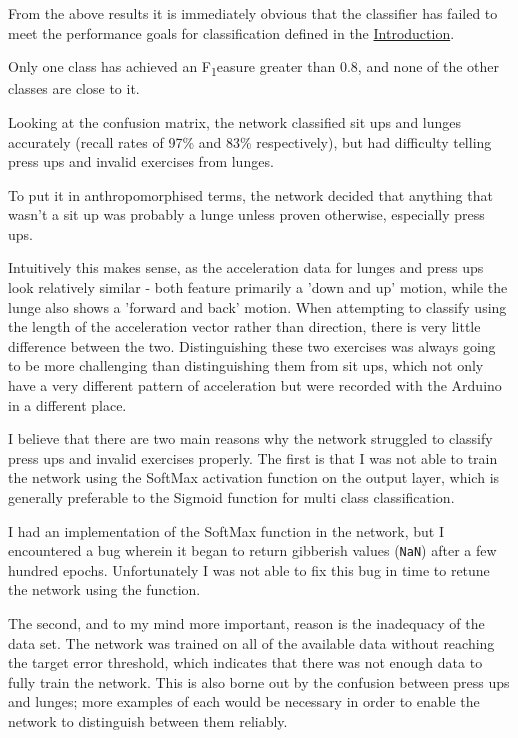\documentclass[a4paper]{article}
\begin{document}
From the above results it is immediately obvious that the classifier has failed to meet the performance goals for classification defined in the \hyperref[subsubsec:in_cs_ecmetrics]{Introduction}.

Only one class has achieved an F\texorpdfstring{\textsubscript{1}} measure greater than 0.8, and none of the other classes are close to it.

Looking at the confusion matrix, the network classified sit ups and lunges accurately (recall rates of 97\% and 83\% respectively), but had difficulty telling press ups and invalid exercises from lunges. 

To put it in anthropomorphised terms, the network decided that anything that wasn't a sit up was probably a lunge unless proven otherwise, especially press ups.

Intuitively this makes sense, as the acceleration data for lunges and press ups look relatively similar - both feature primarily a 'down and up' motion, while the lunge also shows a 'forward and back' motion. When attempting to classify using the length of the acceleration vector rather than direction, there is very little difference between the two.
Distinguishing these two exercises was always going to be more challenging than distinguishing them from sit ups, which not only have a very different pattern of acceleration but were recorded with the Arduino in a different place.

I believe that there are two main reasons why the network struggled to classify press ups and invalid exercises properly. The first is that I was not able to train the network using the SoftMax activation function on the output layer, which is generally preferable to the Sigmoid function for multi class classification.

I had an implementation of the SoftMax function in the network, but I encountered a bug wherein it began to return gibberish values (\lstinline{NaN}) after a few hundred epochs. Unfortunately I was not able to fix this bug in time to retune the network using the function.

The second, and to my mind more important, reason is the inadequacy of the data set. The network was trained on all of the available data without reaching the target error threshold, which indicates that there was not enough data to fully train the network. This is also borne out by the confusion between press ups and lunges; more examples of each would be necessary in order to enable the network to distinguish between them reliably.
\end{document}
